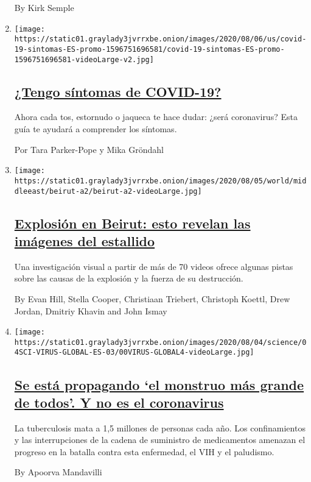 \begin{enumerate}
  By Kirk Semple
\item
  \texttt{[image: https://static01.graylady3jvrrxbe.onion/images/2020/08/06/us/covid-19-sintomas-ES-promo-1596751696581/covid-19-sintomas-ES-promo-1596751696581-videoLarge-v2.jpg]}

  \hypertarget{tengo-suxedntomas-de-covid-19}{%
  \subsection{\texorpdfstring{\href{/es/interactive/2020/08/06/espanol/ciencia-y-tecnologia/tengo-covid-19-sintomas.html}{¿Tengo
  síntomas de
  COVID-19?}}{¿Tengo síntomas de COVID-19?}}\label{tengo-suxedntomas-de-covid-19}}

  Ahora cada tos, estornudo o jaqueca te hace dudar: ¿será coronavirus?
  Esta guía te ayudará a comprender los síntomas.

  Por Tara Parker-Pope y Mika Gröndahl
\item
  \texttt{[image: https://static01.graylady3jvrrxbe.onion/images/2020/08/05/world/middleeast/beirut-a2/beirut-a2-videoLarge.jpg]}

  \hypertarget{explosiuxf3n-en-beirut-esto-revelan-las-imuxe1genes-del-estallido}{%
  \subsection{\texorpdfstring{\href{/es/2020/08/06/espanol/mundo/beirut-video-explosion-libano.html}{Explosión
  en Beirut: esto revelan las imágenes del
  estallido}}{Explosión en Beirut: esto revelan las imágenes del estallido}}\label{explosiuxf3n-en-beirut-esto-revelan-las-imuxe1genes-del-estallido}}

  Una investigación visual a partir de más de 70 videos ofrece algunas
  pistas sobre las causas de la explosión y la fuerza de su destrucción.

  By Evan Hill, Stella Cooper, Christiaan Triebert, Christoph Koettl,
  Drew Jordan, Dmitriy Khavin and John Ismay
\item
  \texttt{[image: https://static01.graylady3jvrrxbe.onion/images/2020/08/04/science/04SCI-VIRUS-GLOBAL-ES-03/00VIRUS-GLOBAL4-videoLarge.jpg]}

  \hypertarget{se-estuxe1-propagando-el-monstruo-muxe1s-grande-de-todos-y-no-es-el-coronavirus}{%
  \subsection{\texorpdfstring{\href{/es/2020/08/05/espanol/ciencia-y-tecnologia/tuberculosis-malaria-coronavirus.html}{Se
  está propagando `el monstruo más grande de todos'. Y no es el
  coronavirus}}{Se está propagando `el monstruo más grande de todos'. Y no es el coronavirus}}\label{se-estuxe1-propagando-el-monstruo-muxe1s-grande-de-todos-y-no-es-el-coronavirus}}

  La tuberculosis mata a 1,5 millones de personas cada año. Los
  confinamientos y las interrupciones de la cadena de suministro de
  medicamentos amenazan el progreso en la batalla contra esta
  enfermedad, el VIH y el paludismo.

  By Apoorva Mandavilli
\end{enumerate}

